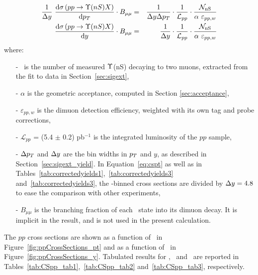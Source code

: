 \begin{eqnarray} 
\label{eq:cspt}
\dfrac{1}{\Delta y}\ \dfrac{\text{d}\sigma\left( pp\rightarrow
    \Upsilon(nS)X\right)}{\text{d}p_{T}} \cdot B_{\mu\mu} &=&
\dfrac{1}{\Delta y \Delta
  p_{T}}\cdot\dfrac{1}{\mathcal{L}_{pp}}\cdot\dfrac{{\cal N}_{\rm nS}}{\alpha\
  \varepsilon_{pp, w} } \\
\label{eq:csrap}
\dfrac{\text{d}\sigma\left( pp\rightarrow
\Upsilon(nS)X\right)}{\text{d}y} \cdot B_{\mu\mu} &=&
\dfrac{1}{\Delta
  y}\cdot\dfrac{1}{\mathcal{L}_{pp}}\cdot\dfrac{{\cal N}_{\rm nS}} {\alpha\
  \varepsilon_{pp, w}} 
\end{eqnarray}
% 
where:
\begin{itemize}
\item[-]{\NFitnS\ is the number of measured $\Upsilon$(nS) decaying to
two muons, extracted from the fit
to data in Section~\ref{sec:sigext},}
\item[-]{$\alpha$ is the geometric acceptance, computed in Section
\ref{sec:acceptance},}
\item[-]{$\varepsilon_{pp, w}$ is the dimuon detection efficiency, weighted with its own
    tag and probe corrections,}
\item[-]{$\mathcal{L}_{pp}$ = (5.4 $\pm$ 0.2) pb$^{-1}$ is the integrated
luminosity of the $pp$ sample,}
\item[-]{$\Delta p_{T}$ and $\Delta y$ are the bin widths in $p_{T}$ and $y$,
    as described in Section~\ref{sec:sigext_yield}.
    In Equation~\ref{eq:cspt} as well as in Tables~\ref{tab:correctedyields1},~\ref{tab:correctedyields3}
    and~\ref{tab:correctedyields3}, the \pt-binned cross sections are divided by $\Delta y = 4.8$ to ease the comparison
    with other experiments,}
\item[-]{$B_{\mu\mu}$ is the branching fraction of each \PgU\ state into
    its dimuon decay. It is implicit in the result, and is not used in
    the present calculation.}
\end{itemize}
%
The $pp$ cross sections are shown as
a function of \pt\ in Figure~\ref{fig:ppCrossSections_pt} and as a function of
\y\ in Figure~\ref{fig:ppCrossSections_y}. Tabulated results for \PgUa,
\PgUb\ and \PgUc\ are reported in Tables~\ref{tab:CSpp_tab1},~\ref{tab:CSpp_tab2}
    and~\ref{tab:CSpp_tab3}, respectively.
%
